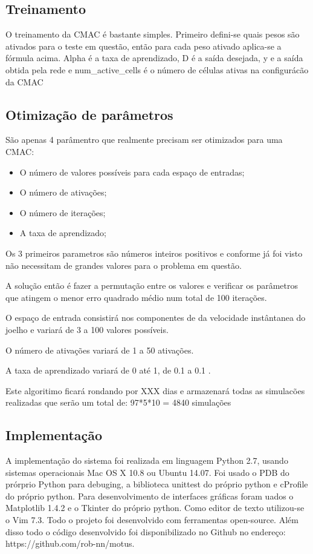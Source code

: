 \documentclass[a4paper, 12pt] {report}
\begin{document}
			\subsection{Treinamento}

O treinamento da CMAC é bastante simples. Primeiro defini-se quais pesos são ativados para o teste em questão, então para cada peso ativado aplica-se a fórmula acima. Alpha é a taxa de aprendizado, D é a saída desejada, y e a saída obtida pela rede e num\_active\_cells é o número de células ativas na configurácão da CMAC


			\subsection{Otimização de parâmetros}

São apenas 4 parâmentro que realmente precisam ser otimizados para uma CMAC:
				\begin{itemize}
					\item O número de valores possíveis para cada espaço de entradas;
					\item O número de ativações;
					\item O número de iterações;
					\item A taxa de aprendizado;
				\end{itemize}
Os 3 primeiros parametros são números inteiros positivos e conforme já foi visto não necessitam de grandes valores para o problema em questão.

A solução então é fazer a permutação entre os valores e verificar os parâmetros que atingem o menor erro quadrado médio num total de 100 iterações.

O espaço de entrada consistirá nos componentes de da velocidade instântanea do joelho e variará de 3 a 100 valores possíveis.

O número de ativações variará de 1 a 50 ativações.

A taxa de aprendizado variará de 0 até 1, de 0.1 a 0.1 .

Este algoritimo ficará rondando por XXX dias e armazenará todas as simulacões realizadas que serão um total de: 97*5*10 =  4840 simulações

			\subsection{Implementação}
A implementação do sistema foi realizada em linguagem Python 2.7, usando sistemas operacionais Mac OS X 10.8 ou Ubuntu 14.07. Foi usado o PDB do prórprio Python para debuging, a biblioteca unittest do próprio python e cProfile do próprio python. Para desenvolvimento de interfaces gráficas foram uados o Matplotlib 1.4.2 e o Tkinter do próprio python. Como editor de texto utilizou-se o Vim 7.3. Todo o projeto foi desenvolvido com ferramentas open-source. Além disso todo o código desenvolvido foi disponibilizado no Github no endereço: https://github.com/rob-nn/motus. 
\end{document}
